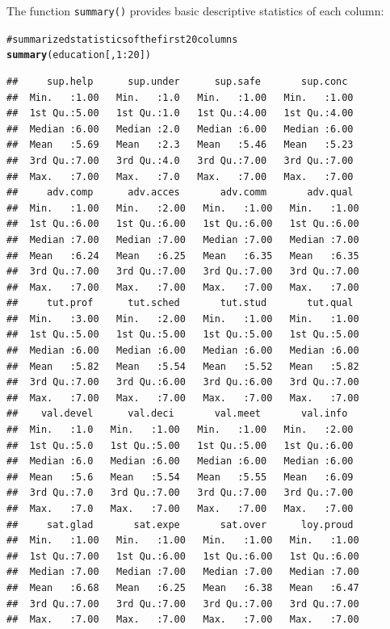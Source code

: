 \documentclass[12pt]{book}\usepackage{graphicx, color}
\makeatletter
\newcommand{\hlfunctioncall}[1]{\textcolor[rgb]{0.501960784313725,0,0.329411764705882}{\textbf{#1}}}%
\newcommand{\hlcomment}[1]{\textcolor[rgb]{0.180392156862745,0.6,0.341176470588235}{#1}}%
\newenvironment{kframe}{%
 \def\at@end@of@kframe{}%
 \ifinner\ifhmode%
  \def\at@end@of@kframe{\end{minipage}}%
  \begin{minipage}{\columnwidth}%
 \fi\fi%
 \def\FrameCommand##1{\hskip\@totalleftmargin \hskip-\fboxsep
 \colorbox{shadecolor}{##1}\hskip-\fboxsep
     \hskip-\linewidth \hskip-\@totalleftmargin \hskip\columnwidth}%
 \MakeFramed {\advance\hsize-\width
   \@totalleftmargin\z@ \linewidth\hsize
   \@setminipage}}%
 {\par\unskip\endMakeFramed%
 \at@end@of@kframe}
\newenvironment{knitrout}{}{} %
\newcommand{\code}[1]{\texttt{#1}}
\makeatother
\begin{document}
The function \code{summary()} provides basic descriptive statistics of each column:
\begin{knitrout}\small
{}\color{fgcolor}\begin{kframe}
\begin{alltt}
\hlcomment{# summarized statistics of the first 20 columns}
\hlfunctioncall{summary}(education[, 1:20])
\end{alltt}
\begin{verbatim}
##     sup.help      sup.under      sup.safe       sup.conc   
##  Min.   :1.00   Min.   :1.0   Min.   :1.00   Min.   :1.00  
##  1st Qu.:5.00   1st Qu.:1.0   1st Qu.:4.00   1st Qu.:4.00  
##  Median :6.00   Median :2.0   Median :6.00   Median :6.00  
##  Mean   :5.69   Mean   :2.3   Mean   :5.46   Mean   :5.23  
##  3rd Qu.:7.00   3rd Qu.:4.0   3rd Qu.:7.00   3rd Qu.:7.00  
##  Max.   :7.00   Max.   :7.0   Max.   :7.00   Max.   :7.00  
##     adv.comp      adv.acces       adv.comm       adv.qual   
##  Min.   :1.00   Min.   :2.00   Min.   :1.00   Min.   :1.00  
##  1st Qu.:6.00   1st Qu.:6.00   1st Qu.:6.00   1st Qu.:6.00  
##  Median :7.00   Median :7.00   Median :7.00   Median :7.00  
##  Mean   :6.24   Mean   :6.25   Mean   :6.35   Mean   :6.35  
##  3rd Qu.:7.00   3rd Qu.:7.00   3rd Qu.:7.00   3rd Qu.:7.00  
##  Max.   :7.00   Max.   :7.00   Max.   :7.00   Max.   :7.00  
##     tut.prof      tut.sched       tut.stud       tut.qual   
##  Min.   :3.00   Min.   :2.00   Min.   :1.00   Min.   :1.00  
##  1st Qu.:5.00   1st Qu.:5.00   1st Qu.:5.00   1st Qu.:5.00  
##  Median :6.00   Median :6.00   Median :6.00   Median :6.00  
##  Mean   :5.82   Mean   :5.54   Mean   :5.52   Mean   :5.82  
##  3rd Qu.:7.00   3rd Qu.:6.00   3rd Qu.:6.00   3rd Qu.:7.00  
##  Max.   :7.00   Max.   :7.00   Max.   :7.00   Max.   :7.00  
##    val.devel      val.deci       val.meet       val.info   
##  Min.   :1.0   Min.   :1.00   Min.   :1.00   Min.   :2.00  
##  1st Qu.:5.0   1st Qu.:5.00   1st Qu.:5.00   1st Qu.:6.00  
##  Median :6.0   Median :6.00   Median :6.00   Median :6.00  
##  Mean   :5.6   Mean   :5.54   Mean   :5.55   Mean   :6.09  
##  3rd Qu.:7.0   3rd Qu.:7.00   3rd Qu.:7.00   3rd Qu.:7.00  
##  Max.   :7.0   Max.   :7.00   Max.   :7.00   Max.   :7.00  
##     sat.glad       sat.expe       sat.over      loy.proud   
##  Min.   :1.00   Min.   :1.00   Min.   :1.00   Min.   :1.00  
##  1st Qu.:7.00   1st Qu.:6.00   1st Qu.:6.00   1st Qu.:6.00  
##  Median :7.00   Median :7.00   Median :7.00   Median :7.00  
##  Mean   :6.68   Mean   :6.25   Mean   :6.38   Mean   :6.47  
##  3rd Qu.:7.00   3rd Qu.:7.00   3rd Qu.:7.00   3rd Qu.:7.00  
##  Max.   :7.00   Max.   :7.00   Max.   :7.00   Max.   :7.00
\end{verbatim}
\end{kframe}
\end{knitrout}
\end{document}
